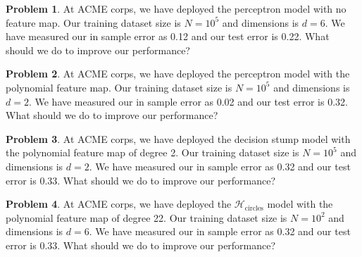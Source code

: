 \documentclass[10pt]{exam}
\theoremstyle{definition}
\newtheorem{problem}{Problem}
\newcommand{\HH}[1]{\mathcal H_{\text{#1}}}
\begin{document}
\newpage
\begin{problem}
At ACME corps, we have deployed the perceptron model with no feature map.
Our training dataset size is $N=10^5$ and dimensions is $d=6$.
We have measured our in sample error as 0.12 and our test error is 0.22.
What should we do to improve our performance?
\end{problem}

\begin{problem}
At ACME corps, we have deployed the perceptron model with the polynomial feature map.
Our training dataset size is $N=10^5$ and dimensions is $d=2$.
We have measured our in sample error as 0.02 and our test error is 0.32.
What should we do to improve our performance?
\end{problem}

\begin{problem}
At ACME corps, we have deployed the decision stump model with the polynomial feature map of degree 2.
Our training dataset size is $N=10^5$ and dimensions is $d=2$.
We have measured our in sample error as 0.32 and our test error is 0.33.
What should we do to improve our performance?
\end{problem}

\begin{problem}
At ACME corps, we have deployed the $\HH{circles}$ model with the polynomial feature map of degree 22.
Our training dataset size is $N=10^2$ and dimensions is $d=6$.
We have measured our in sample error as 0.32 and our test error is 0.33.
What should we do to improve our performance?
\end{problem}
\end{document}
